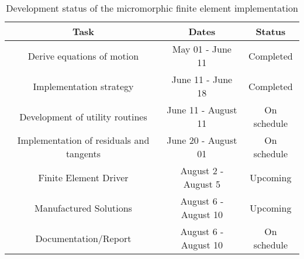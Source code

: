 \begin{table}[htb!]
\centering
\begin{tabular}{|c|c|c|}
\hline
Task & Dates & Status\\
\hline
\hline
Derive equations of motion & May 01 - June 11 & \cellcolor{green!25}Completed\\
\hline
Implementation strategy & June 11 - June 18 & \cellcolor{green!25}Completed\\
\hline
Development of utility routines & June 11 - August 11 & \cellcolor{yellow!25} On schedule\\
\hline
Implementation of residuals and tangents & June 20 - August 01 & \cellcolor{yellow!25} On schedule\\
\hline
Finite Element Driver & August 2 - August 5 & \cellcolor{blue!25} Upcoming\\
\hline
Manufactured Solutions & August 6 - August 10 & \cellcolor{blue!25} Upcoming\\
\hline
Documentation/Report & August 6 - August 10 & \cellcolor{yellow!25} On schedule\\
\hline
\end{tabular}
\caption{Development status of the micromorphic finite element implementation}
\label{table:development_status}
\end{table}